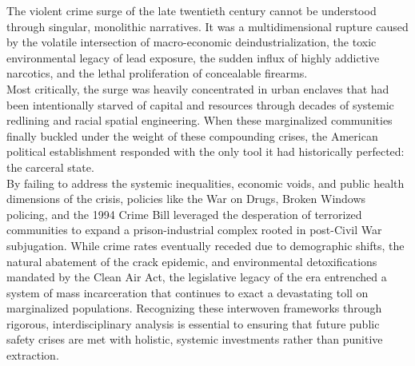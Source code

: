\documentclass[
]{article}
\newcounter{none} %
\begin{document}
The violent crime surge of the late twentieth century cannot be
understood through singular, monolithic narratives. It was a
multidimensional rupture caused by the volatile intersection of
macro-economic deindustrialization, the toxic environmental legacy of
lead exposure, the sudden influx of highly addictive narcotics, and the
lethal proliferation of concealable firearms.\\
Most critically, the surge was heavily concentrated in urban enclaves
that had been intentionally starved of capital and resources through
decades of systemic redlining and racial spatial engineering. When these
marginalized communities finally buckled under the weight of these
compounding crises, the American political establishment responded with
the only tool it had historically perfected: the carceral state.\\
By failing to address the systemic inequalities, economic voids, and
public health dimensions of the crisis, policies like the War on Drugs,
Broken Windows policing, and the 1994 Crime Bill leveraged the
desperation of terrorized communities to expand a prison-industrial
complex rooted in post-Civil War subjugation. While crime rates
eventually receded due to demographic shifts, the natural abatement of
the crack epidemic, and environmental detoxifications mandated by the
Clean Air Act, the legislative legacy of the era entrenched a system of
mass incarceration that continues to exact a devastating toll on
marginalized populations. Recognizing these interwoven frameworks
through rigorous, interdisciplinary analysis is essential to ensuring
that future public safety crises are met with holistic, systemic
investments rather than punitive extraction.

\nocite{*}
\printbibliography[title={Works cited},sorting=none]
\label{works-cited}
\end{document}
